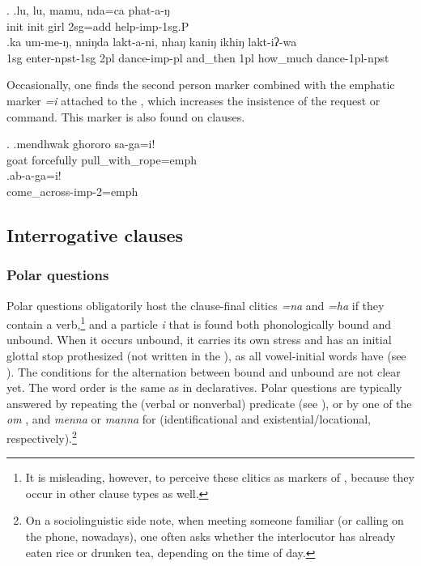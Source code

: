 \ex. \ag.lu,         lu,         mamu, nda=ca        phat-a-ŋ\\
{\sc init} {\sc init} girl {\sc 2sg=add} help{\sc -imp-1sg.P} \\
 
\bg.ka  um-me-ŋ,            nniŋda lakt-a-ni,           nhaŋ    kaniŋ ikhiŋ   lakt-iʔ-wa\\
{\sc 1sg} enter{\sc -npst-1sg}  {\sc 2pl} dance{\sc -imp-pl} and\_then {\sc 1pl} how\_much dance{\sc -1pl-npst}\\
 

Occasionally, one finds the second person marker combined with the emphatic marker \emph{=i} attached to the , which increases the insistence  of the request or command. This marker is also found on  clauses.

\ex. \ag.mendhwak ghororo sa-ga=i!\\
goat forcefully pull\_with\_rope{=emph}\\
\bg.ab-a-ga=i!\\
come\_across{\sc -imp-2=emph}\\

\subsection{Interrogative clauses}
  
  
  
\subsubsection{Polar questions}
 
 Polar questions obligatorily host the clause-final clitics \emph{=na} and \emph{=ha} if they contain a verb,\footnote{It is misleading, however, to perceive these clitics as markers of , because they occur in other clause types as well.} and  a particle \emph{i}  that is found both phonologically bound and unbound. When it occurs unbound, it carries its own stress and has an initial glottal stop prothesized (not written in the ), as all  vowel-initial words have (see \Next). The conditions for the alternation between bound and unbound are not clear yet. The word order is the same as in declaratives. Polar questions are typically answered by repeating the (verbal or nonverbal)  predicate (see \NNext), or by one of the  \emph{om} , and \emph{menna} or \emph{manna} for  (identificational and existential/locational, respectively).\footnote{On a sociolinguistic side note, when meeting someone familiar (or calling on the phone, nowadays), one often asks whether the interlocutor has already eaten rice or drunken tea, depending on the time of day.}
 
